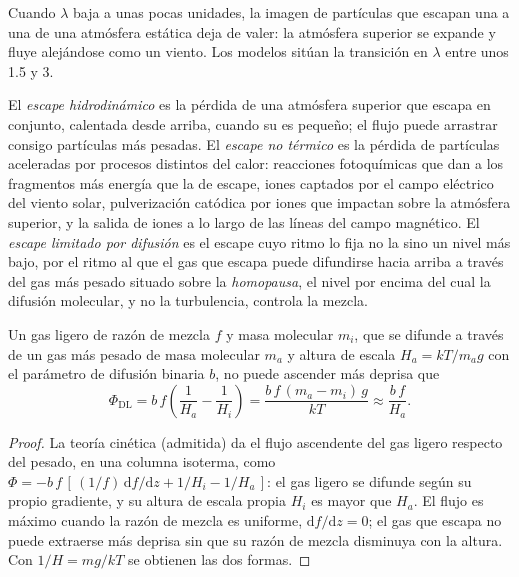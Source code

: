 
Cuando $\lambda$ baja a unas pocas unidades, la imagen de partículas que escapan una a una
de una atmósfera estática deja de valer: la atmósfera superior se expande y fluye
alejándose como un viento. Los modelos sitúan la transición en $\lambda$ entre unos 1.5
y 3.

\begin{definition}\label{def:b3:planetary-atmospheres:hydrodynamic}
El \emph{escape hidrodinámico} es la pérdida de una
atmósfera superior que escapa en conjunto, calentada desde arriba, cuando su
 es pequeño; el flujo puede arrastrar consigo partículas más pesadas.
El \emph{escape no térmico} es la pérdida de
partículas aceleradas por procesos distintos del calor: reacciones fotoquímicas
que dan a los fragmentos más energía que la de escape, iones captados
por el campo eléctrico del viento solar, pulverización catódica por iones que impactan
sobre la atmósfera superior, y la salida de iones a lo largo de las líneas del campo magnético.
El \emph{escape limitado por difusión} es el escape
cuyo ritmo lo fija no la  sino un nivel más bajo, por el ritmo al que
el gas que escapa puede difundirse hacia arriba a través del gas más pesado situado sobre la
\emph{homopausa}, el nivel por encima del cual la difusión
molecular, y no la turbulencia, controla la mezcla.
\end{definition}

\begin{proposition}\label{prop:b3:planetary-atmospheres:diffusion}
Un gas ligero de razón de mezcla $f$ y masa molecular $m_i$, que se difunde
a través de un gas más pesado de masa molecular $m_a$ y altura de escala $H_a =
kT/m_a g$ con el parámetro de difusión binaria $b$, no puede ascender más deprisa
que
\[
\Phi_\mathrm{DL} = b\,f\left(\frac1{H_a} - \frac1{H_i}\right)
= \frac{b\,f\,(m_a - m_i)\,g}{kT} \approx \frac{b\,f}{H_a}.
\]
\end{proposition}

\begin{proof}
La teoría cinética (admitida) da el flujo ascendente del gas ligero
respecto del pesado, en una columna isoterma, como $\Phi = -b\,f\,
[\,(1/f)\,\mathrm df/\mathrm dz + 1/H_i - 1/H_a\,]$: el gas ligero
se difunde según su propio gradiente, y su altura de escala propia $H_i$ es mayor
que $H_a$. El flujo es máximo cuando la razón de mezcla es uniforme, $\mathrm
df/\mathrm dz = 0$; el gas que escapa no puede extraerse más deprisa sin que su
razón de mezcla disminuya con la altura. Con $1/H = mg/kT$ se obtienen
las dos formas.
\end{proof}

